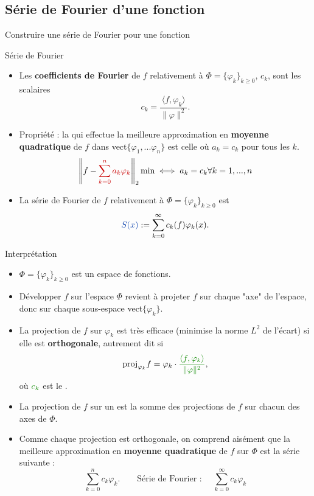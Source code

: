 \documentclass[9pt]{beamer}
\newcommand\serie{\sum_{k=0} ^\infty}
\newcommand\serien{\sum_{k=0} ^n}
\begin{document}
\subsection{Série de Fourier d'une fonction}
\begin{frame}{Construire une série de Fourier pour une fonction}
\begin{block}{Série de Fourier}
\begin{itemize}
\item Les \textbf{coefficients de Fourier} de $f$ relativement à $\Phi = \{\varphi_k\}_{k\geq 0}$,  $c_k$, sont les scalaires $$c_k = \dfrac{\langle f, \varphi_k \rangle}{\|\varphi \| ^2}.$$
\item Propriété : la  qui effectue la meilleure approximation en \textbf{moyenne quadratique} de $f$ dans vect$\{\varphi_1, ... \varphi_n\}$ est celle où $a_k = c_k$ pour tous les $k$.
$$\left\| f-\rouge{\serien a_k \varphi_k} \right\|_2 \text{min} \iff a_k = c_k \forall k =1, ..., n$$
\item La série de Fourier de $f$ relativement à $\Phi = \{\varphi_k\}_{k\geq 0}$ est $$\bleu{S(x)}  :=\serie c_k(f) \varphi_k(x) .$$

\end{itemize}

\end{block}
\end{frame}
\begin{frame}{Interprétation}
\begin{itemize}
\item $\Phi = \{\varphi_k\}_{k\geq 0}$ est un espace de fonctions.
\item Développer $f$ sur l'espace $\Phi$ revient à projeter $f$ sur chaque "axe" de l'espace, donc sur chaque sous-espace vect$\{\varphi_k\}$. 
\item La projection de $f$ sur $\varphi_k$ est très efficace (minimise la norme $L^2$ de l'écart) si elle est \textbf{orthogonale}, autrement dit si $$\text{proj}_{\varphi_k} f = \varphi_k \cdot \green{\dfrac{\langle f, \varphi_k \rangle}{\|\varphi \| ^2}},$$ où $\green{c_k}$ est le .
\item La projection de $f$ sur un  est la somme des projections de $f$ sur chacun des axes de $\Phi$. 
\item Comme chaque projection est orthogonale, on comprend aisément que la meilleure approximation en \textbf{moyenne quadratique} de $f$ sur $\Phi$ est la série suivante : $$\serien c_k \varphi_k. \qquad \text{Série de Fourier : } \quad \serie c_k \varphi_k$$
\end{itemize}
\end{frame}
\end{document}
